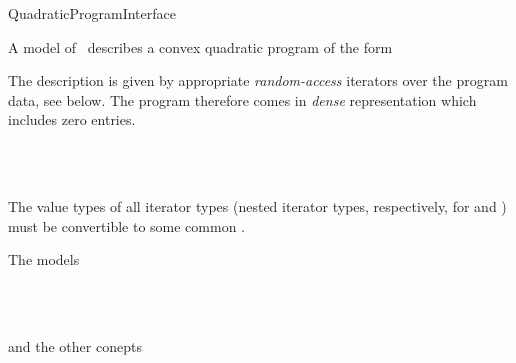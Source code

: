 \begin{ccRefConcept}{QuadraticProgramInterface}

\ccDefinition
A model of \ccRefName\ describes a convex quadratic program of the form


The description is given by appropriate \emph{random-access} 
iterators over the program data, see below. The program therefore 
comes in \emph{dense} representation which includes zero entries.

\ccHasModels
{}\\
\\

\ccTypes









\ccOperations










\ccRequirements

The value types of all iterator types (nested iterator types,
respectively, for  and ) must be
convertible to some common  .

\ccSeeAlso
The models

\\
\\

and the other conepts

\\
\\
\end{ccRefConcept}
